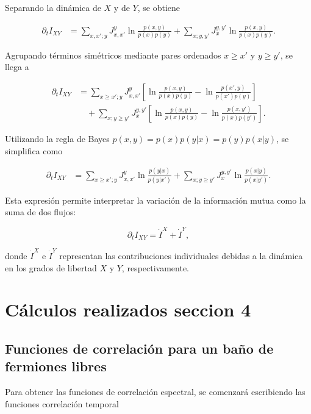 \begin{appendixs}
Separando la dinámica de \(X\) y de \(Y\), se obtiene

\begin{align*}
    \partial_{t} I_{XY} &= \sum_{x,x';y} J_{x,x'}^{y} \ln \frac{p(x,y)}{p(x)p(y)} 
    + \sum_{x;y,y'} J_{x}^{y,y'} \ln \frac{p(x,y)}{p(x)p(y)}.
\end{align*}

Agrupando términos simétricos mediante pares ordenados \(x \geq x'\) y \(y \geq y'\), se llega a

\begin{align*}
    \partial_{t} I_{XY} &= \sum_{x \geq x';y} J_{x,x'}^{y} \left[ \ln \frac{p(x,y)}{p(x)p(y)} - \ln \frac{p(x',y)}{p(x')p(y)} \right] \nonumber \\
    &\quad + \sum_{x;y \geq y'} J_{x}^{y,y'} \left[ \ln \frac{p(x,y)}{p(x)p(y)} - \ln \frac{p(x,y')}{p(x)p(y')} \right].
\end{align*}

Utilizando la regla de Bayes \(p(x,y) = p(x)p(y|x) = p(y)p(x|y)\), se simplifica como

\begin{align*}
    \partial_{t} I_{XY} 
    &= \sum_{x \geq x';y} J_{x,x'}^{y} \ln \frac{p(y|x)}{p(y|x')} 
     + \sum_{x;y \geq y'} J_{x}^{y,y'} \ln \frac{p(x|y)}{p(x|y')}.
\end{align*}

Esta expresión permite interpretar la variación de la información mutua como la suma de dos flujos:

\begin{equation*}
    \partial_{t} I_{XY} = \dot{I}^{X} + \dot{I}^{Y},
\end{equation*}

donde \(\dot{I}^{X}\) e \(\dot{I}^{Y}\) representan las contribuciones individuales debidas a la dinámica en los grados de libertad \(X\) y \(Y\), respectivamente.


    \label{apendix4:secondlaw}


\newpage

\section{Cálculos realizados seccion 4}
\subsection{Funciones de correlación para un baño de fermiones libres}
Para obtener las funciones de correlación espectral, se comenzará escribiendo las funciones correlación temporal 


\end{appendixs}
